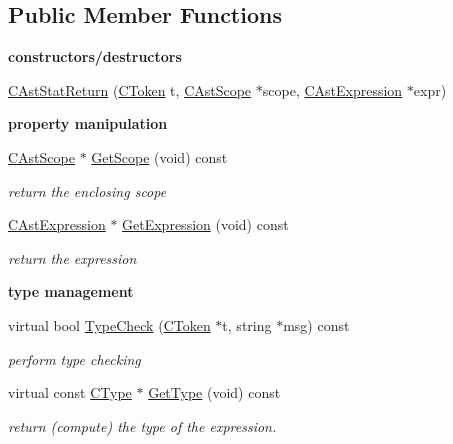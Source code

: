 \subsection*{Public Member Functions}
\begin{Indent}{\bf constructors/destructors}\par
\begin{DoxyCompactItemize}
\item 
\hyperlink{classCAstStatReturn_a9bed350f5e2618c1634d70813b66e18d}{C\-Ast\-Stat\-Return} (\hyperlink{classCToken}{C\-Token} t, \hyperlink{classCAstScope}{C\-Ast\-Scope} $\ast$scope, \hyperlink{classCAstExpression}{C\-Ast\-Expression} $\ast$expr)
\end{DoxyCompactItemize}
\end{Indent}
\begin{Indent}{\bf property manipulation}\par
\begin{DoxyCompactItemize}
\item 
\hyperlink{classCAstScope}{C\-Ast\-Scope} $\ast$ \hyperlink{classCAstStatReturn_aeba9120294bac718824acfde491be9f1}{Get\-Scope} (void) const 
\begin{DoxyCompactList}\small\item\em return the enclosing scope \end{DoxyCompactList}\item 
\hyperlink{classCAstExpression}{C\-Ast\-Expression} $\ast$ \hyperlink{classCAstStatReturn_a33ebb8a436037374e47a48dcccd566b8}{Get\-Expression} (void) const 
\begin{DoxyCompactList}\small\item\em return the expression \end{DoxyCompactList}\end{DoxyCompactItemize}
\end{Indent}
\begin{Indent}{\bf type management}\par
\begin{DoxyCompactItemize}
\item 
virtual bool \hyperlink{classCAstStatReturn_a34ecebe160b43f96626c3e216fdd048e}{Type\-Check} (\hyperlink{classCToken}{C\-Token} $\ast$t, string $\ast$msg) const 
\begin{DoxyCompactList}\small\item\em perform type checking \end{DoxyCompactList}\item 
\hypertarget{classCAstStatReturn_a4fa38f5d7d496b0bcffb8c988039bfc2}{virtual const \hyperlink{classCType}{C\-Type} $\ast$ \hyperlink{classCAstStatReturn_a4fa38f5d7d496b0bcffb8c988039bfc2}{Get\-Type} (void) const }\label{classCAstStatReturn_a4fa38f5d7d496b0bcffb8c988039bfc2}

\begin{DoxyCompactList}\small\item\em return (compute) the type of the expression. \end{DoxyCompactList}\end{DoxyCompactItemize}
\end{Indent}

